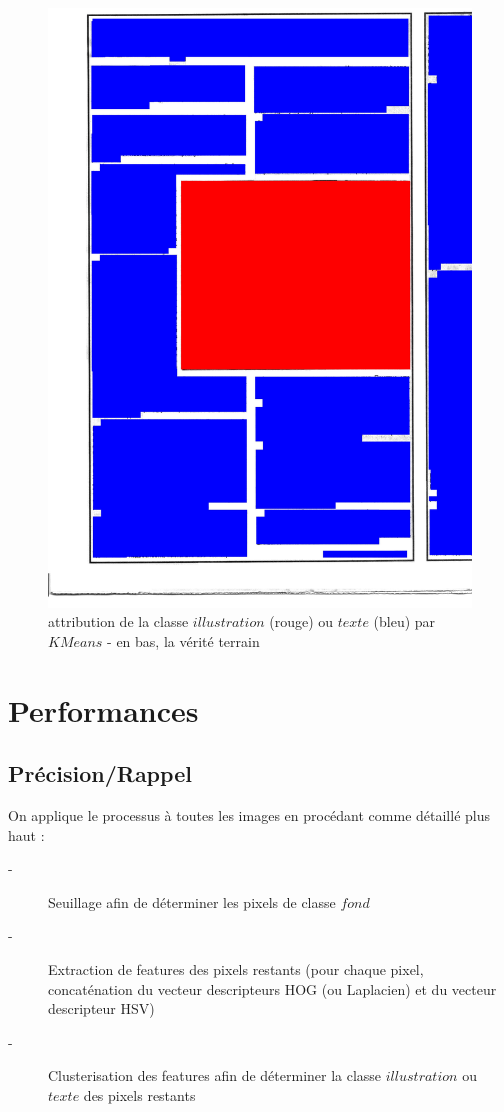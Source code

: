 \documentclass{book}
\begin{document}
\begin{figure}[H]
\begin{center}
\includegraphics[scale=0.3]{images/1g_m.jpg}
\end{center}
\caption{attribution de la classe $illustration$ (rouge) ou $texte$ (bleu) par $KMeans$ - en bas, la vérité terrain}
\label{resultat}
\end{figure}


\chapter{Performances}

\section{Précision/Rappel}

On applique le processus à toutes les images en procédant comme détaillé plus haut :

\begin{description}
 \item[-] Seuillage afin de déterminer les pixels de classe $fond$
 \item[-] Extraction de features des pixels restants (pour chaque pixel, concaténation du vecteur descripteurs HOG (ou Laplacien) et du vecteur descripteur HSV)
 \item[-] Clusterisation des features afin de déterminer la classe $illustration$ ou $texte$ des pixels restants
\end{description}
\end{document}
